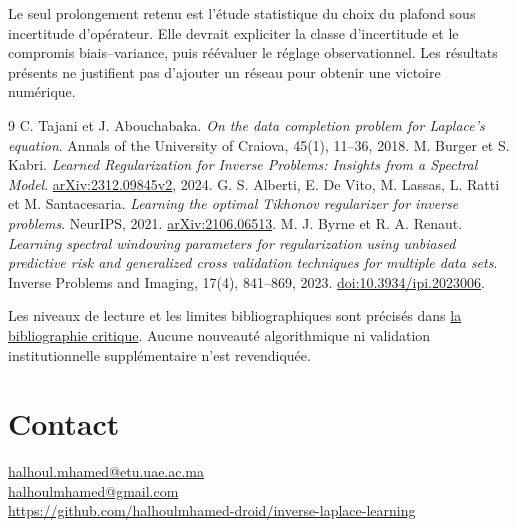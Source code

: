\documentclass[11pt,a4paper]{article}
\newcommand{\src}[2]{\href{\DataURL{#1}}{#2}}
\begin{document}
Le seul prolongement retenu est l'étude statistique du choix du plafond sous incertitude d'opérateur. Elle devrait expliciter la classe d'incertitude et le compromis biais--variance, puis réévaluer le réglage observationnel. Les résultats présents ne justifient pas d'ajouter un réseau pour obtenir une victoire numérique.

\clearpage
\begin{thebibliography}{9}\small
{} C. Tajani et J. Abouchabaka. \emph{On the data completion problem for Laplace's equation}. Annals of the University of Craiova, 45(1), 11--36, 2018.
 M. Burger et S. Kabri. \emph{Learned Regularization for Inverse Problems: Insights from a Spectral Model}. \href{https://arxiv.org/abs/2312.09845v2}{arXiv:2312.09845v2}, 2024.
 G. S. Alberti, E. De Vito, M. Lassas, L. Ratti et M. Santacesaria. \emph{Learning the optimal Tikhonov regularizer for inverse problems}. NeurIPS, 2021. \href{https://arxiv.org/abs/2106.06513}{arXiv:2106.06513}.
 M. J. Byrne et R. A. Renaut. \emph{Learning spectral windowing parameters for regularization using unbiased predictive risk and generalized cross validation techniques for multiple data sets}. Inverse Problems and Imaging, 17(4), 841--869, 2023. \href{https://doi.org/10.3934/ipi.2023006}{doi:10.3934/ipi.2023006}.
\end{thebibliography}
Les niveaux de lecture et les limites bibliographiques sont précisés dans \src{docs/sources.md}{la bibliographie critique}. Aucune nouveauté algorithmique ni validation institutionnelle supplémentaire n'est revendiquée.
\section*{Contact}
\href{mailto:halhoul.mhamed@etu.uae.ac.ma}{halhoul.mhamed@etu.uae.ac.ma}\\
\href{mailto:halhoulmhamed@gmail.com}{halhoulmhamed@gmail.com}\\
\url{https://github.com/halhoulmhamed-droid/inverse-laplace-learning}
\end{document}
